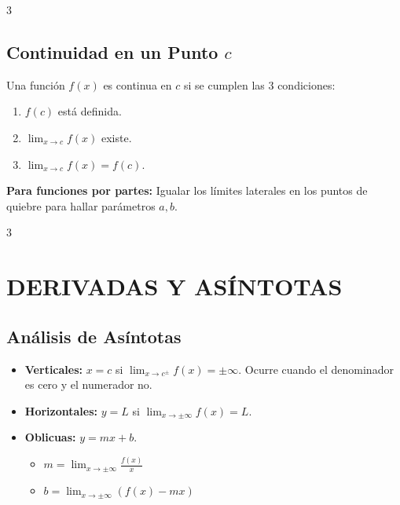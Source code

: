 \documentclass[8pt,letterpaper]{article}
\begin{document}
\begin{multicols*}{3}
\subsection*{Continuidad en un Punto $c$}
Una función $f(x)$ es continua en $c$ si se cumplen las 3 condiciones:
\begin{enumerate}[label=\arabic*.]
    \item $f(c)$ está definida.
    \item $\lim_{x\to c} f(x)$ existe.
    \item $\lim_{x\to c} f(x) = f(c)$.
\end{enumerate}
\textbf{Para funciones por partes:} Igualar los límites laterales en los puntos de quiebre para hallar parámetros $a, b$.

\end{multicols*}
\newpage
\begin{multicols*}{3}

\section*{DERIVADAS Y ASÍNTOTAS}

\subsection*{Análisis de Asíntotas}
\begin{itemize}
    \item \textbf{Verticales:} $x=c$ si $\lim_{x\to c^\pm} f(x) = \pm \infty$. Ocurre cuando el denominador es cero y el numerador no.
    \item \textbf{Horizontales:} $y=L$ si $\lim_{x\to \pm \infty} f(x) = L$.
    \item \textbf{Oblicuas:} $y=mx+b$.
    \begin{itemize}
        \item $m = \lim_{x\to \pm \infty} \frac{f(x)}{x}$
        \item $b = \lim_{x\to \pm \infty} (f(x) - mx)$
    \end{itemize}
\end{itemize}


\end{multicols*}
\end{document}
